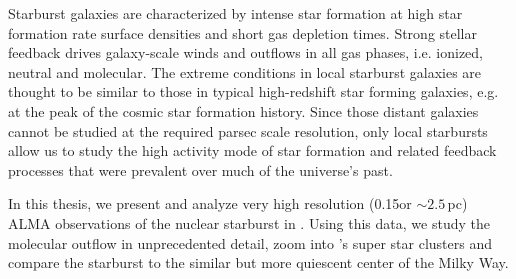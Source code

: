 
\thispagestyle{empty}
\pagecolor{black}\afterpage{\nopagecolor}

\BgThispage

{
\color{white}
\vspace*{-1cm}

Starburst galaxies are characterized by intense star formation at high star formation rate surface densities and short gas depletion times. 
Strong stellar feedback drives galaxy-scale winds and outflows in all gas phases, i.e. ionized, neutral and molecular.
The extreme conditions in local starburst galaxies are thought to be similar to those in typical high-redshift star forming galaxies, e.g. at the peak of the cosmic star formation history.
Since those distant galaxies cannot be studied at the required parsec scale resolution, only local starbursts allow us to study the high activity mode of star formation and related feedback processes that were prevalent over much of the universe's past.

In this thesis, we present and analyze very high resolution (0.15\arcsec or $\sim2.5$\,pc) ALMA observations of the nuclear starburst in . 
Using this data, we study the molecular outflow in unprecedented detail, zoom into 's super star clusters and compare the starburst to the similar but more quiescent center of the Milky Way.
}

\clearpage
\restoregeometry
